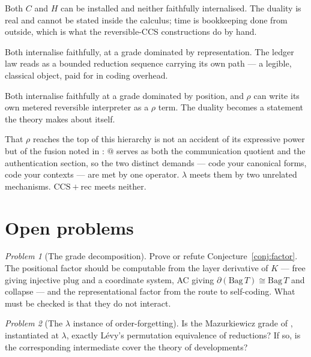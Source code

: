\documentclass[11pt,a4paper]{article}
\theoremstyle{definition}
\theoremstyle{plain}
\theoremstyle{remark}
\newtheorem{problem}{Problem}
\newcommand{\rhoc}{\rho}
\newcommand{\CCSrec}{\mathrm{CCS}{+}\mathrm{rec}}
\begin{document}
\begin{description}[leftmargin=2.4em,style=nextline]
\item[$\CCSrec$: external.] Both $C$ and $H$ can be installed and neither faithfully internalised.
The duality is real and cannot be stated inside the calculus; time is bookkeeping done from outside,
which is what the reversible-CCS constructions do by hand.
\item[$\lambda$: internal by encoding.] Both internalise faithfully, at a grade dominated by
representation. The ledger law reads as a bounded reduction sequence carrying its own path --- a
legible, classical object, paid for in coding overhead.
\item[$\rhoc$: internal primitively.] Both internalise faithfully at a grade dominated by position,
and $\rhoc$ can write its own metered reversible interpreter as a $\rhoc$ term. The duality becomes a
statement the theory makes about itself.
\end{description}

That $\rhoc$ reaches the top of this hierarchy is not an accident of its expressive power but of the
fusion noted in \cite[\S5]{cost}: $@$ serves as both the communication quotient and the
authentication section, so the two distinct demands --- code your canonical forms, code your contexts
--- are met by one operator. $\lambda$ meets them by two unrelated mechanisms. $\CCSrec$ meets
neither.

\section{Open problems}
\label{sec:open}

\begin{problem}[The grade decomposition]
\label{prob:factor}
Prove or refute Conjecture~\ref{conj:factor}. The positional factor should be computable from the
layer derivative of $K$ --- free giving injective $\mathrm{plug}$ and a coordinate system, AC giving
$\partial(\mathrm{Bag}\,T) \cong \mathrm{Bag}\,T$ and collapse --- and the representational factor
from the route to self-coding. What must be checked is that they do not interact.
\end{problem}

\begin{problem}[The $\lambda$ instance of order-forgetting]
\label{prob:levy}
Is the Mazurkiewicz grade of \cite[Rmk.~4.3]{history}, instantiated at $\lambda$, exactly Lévy's
permutation equivalence of reductions? If so, is the corresponding intermediate cover the theory of
developments?
\end{problem}
\end{document}

